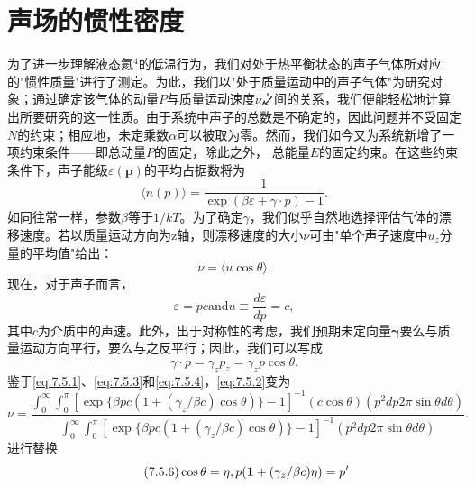 \section{声场的惯性密度}\label{ux58f0ux573aux7684ux60efux6027ux5bc6ux5ea6}
为了进一步理解液态氦\(^{4}\)的低温行为，我们对处于热平衡状态的声子气体所对应的"惯性质量"进行了测定。为此，我们以"处于质量运动中的声子气体"为研究对象；通过确定该气体的动量\(P\)与质量运动速度\(\nu\)之间的关系，我们便能轻松地计算出所要研究的这一性质。由于系统中声子的总数是不确定的，因此问题并不受固定\(N\)的约束；相应地，未定乘数\(\alpha\)可以被取为零。然而，我们如今又为系统新增了一项约束条件——即总动量\(P\)的固定，除此之外，
总能量\(E\)的固定约束。在这些约束条件下，声子能级\(\varepsilon(\boldsymbol{p})\)的平均占据数将为
\begin{equation}\tag{7.5.1}\label{eq:7.5.1}
\langle n ( p ) \rangle = \frac { 1 } { \exp ( \beta \varepsilon + \gamma \cdot p ) - 1 } .
\end{equation}
如同往常一样，参数\(\beta\)等于\(1/kT\)。为了确定\(\gamma\)，我们似乎自然地选择评估气体的漂移速度。若以质量运动方向为z轴，则漂移速度的大小\(\nu\)可由"单个声子速度中\(u_z\)分量的平均值"给出：
\begin{equation}\tag{7.5.2}\label{eq:7.5.2}
\nu = \langle u \cos \theta \rangle .
\end{equation}
现在，对于声子而言，
\begin{equation}\tag{7.5.3}\label{eq:7.5.3}
\varepsilon = p c  \mathrm { a n d }  u \equiv \frac { d \varepsilon } { d p } = c ,
\end{equation}
其中\(c\)为介质中的声速。此外，出于对称性的考虑，我们预期未定向量\(\boldsymbol{\gamma}\)要么与质量运动方向平行，要么与之反平行；因此，我们可以写成
\begin{equation}\tag{7.5.4}\label{eq:7.5.4}
\gamma \cdot p = \gamma _ { z } p _ { z } = \gamma _ { z } p \cos \theta .
\end{equation}
鉴于\autoref{eq:7.5.1}、\autoref{eq:7.5.3}和\autoref{eq:7.5.4}，\autoref{eq:7.5.2}变为
\begin{equation}\tag{7.5.5}\label{eq:7.5.5}
\nu = \frac { \int _ { 0 } ^{\infty} \int _ { 0 } ^{\pi} [ \exp \{ \beta p c ( 1 + ( \gamma _ { z } / \beta c ) \cos \theta ) \} - 1 ] ^{- 1} ( c \cos \theta ) ( p ^{2} d p 2 \pi \sin \theta d \theta ) } { \int _ { 0 } ^{\infty} \int _ { 0 } ^{\pi} [ \exp \{ \beta p c ( 1 + ( \gamma _ { z } / \beta c ) \cos \theta ) \} - 1 ] ^{- 1} ( p ^{2} d p 2 \pi \sin \theta d \theta ) } .
\end{equation}
进行替换
\begin{equation}\tag{7.5.6}\label{eq:7.5.6}
\cos \theta = \eta ,  p ( { \bf 1 } + ( \gamma _ { z } / \beta c ) \eta ) = p ^{\prime}
\end{equation}
